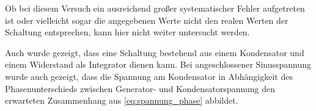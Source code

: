 Ob bei diesem Versuch ein ausreichend großer systematischer Fehler aufgetreten ist oder vielleicht sogar die angegebenen Werte nicht den realen Werten der Schaltung entsprechen, kann hier nicht weiter untersucht werden.

Auch wurde gezeigt, dass eine Schaltung bestehend aus einem Kondensator und einem Widerstand als Integrator dienen kann. Bei angeschlossener Sinusspannung wurde auch gezeigt, dass die Spannung am Kondensator in Abhängigkeit des Phasenunterschieds zwischen Generator- und Kondensatorspannung den erwarteten Zusammenhang aus \autoref{eq:spannung_phase} abbildet.